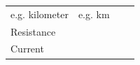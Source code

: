 \begin{enumerate}[noitemsep, label=\textbf{\arabic*}. ]
{\begin{tabular}[t]{|l|l|l|l|}
    
        e.g. kilometer &
    
    
        e.g. km%
     \tabularnewline\cline{1-1}\cline{2-2}\cline{3-3}\cline{4-4}
    
    
        Resistance &
    
    
         &
    
    
         &
    
    
     \tabularnewline\cline{1-1}\cline{2-2}\cline{3-3}\cline{4-4}
    
    
        Current &
    
    
         &
    

\end{tabular}}
\end{enumerate}

